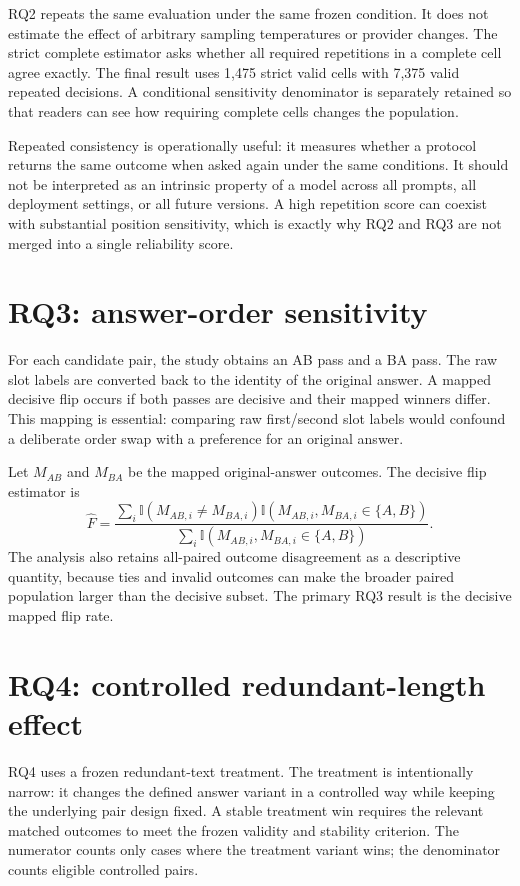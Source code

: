 RQ2 repeats the same evaluation under the same frozen condition. It does not estimate the effect of arbitrary sampling temperatures or provider changes. The strict complete estimator asks whether all required repetitions in a complete cell agree exactly. The final result uses 1,475 strict valid cells with 7,375 valid repeated decisions. A conditional sensitivity denominator is separately retained so that readers can see how requiring complete cells changes the population.

Repeated consistency is operationally useful: it measures whether a protocol returns the same outcome when asked again under the same conditions. It should not be interpreted as an intrinsic property of a model across all prompts, all deployment settings, or all future versions. A high repetition score can coexist with substantial position sensitivity, which is exactly why RQ2 and RQ3 are not merged into a single reliability score.

\section{RQ3: answer-order sensitivity}

For each candidate pair, the study obtains an AB pass and a BA pass. The raw slot labels are converted back to the identity of the original answer. A mapped decisive flip occurs if both passes are decisive and their mapped winners differ. This mapping is essential: comparing raw first/second slot labels would confound a deliberate order swap with a preference for an original answer.

Let $M_{AB}$ and $M_{BA}$ be the mapped original-answer outcomes. The decisive flip estimator is
\[
\hat{F}=\frac{\sum_i \mathbb{I}(M_{AB,i}\neq M_{BA,i})\mathbb{I}(M_{AB,i},M_{BA,i}\in\{A,B\})}{\sum_i \mathbb{I}(M_{AB,i},M_{BA,i}\in\{A,B\})}.
\]
The analysis also retains all-paired outcome disagreement as a descriptive quantity, because ties and invalid outcomes can make the broader paired population larger than the decisive subset. The primary RQ3 result is the decisive mapped flip rate.

\section{RQ4: controlled redundant-length effect}

RQ4 uses a frozen redundant-text treatment. The treatment is intentionally narrow: it changes the defined answer variant in a controlled way while keeping the underlying pair design fixed. A stable treatment win requires the relevant matched outcomes to meet the frozen validity and stability criterion. The numerator counts only cases where the treatment variant wins; the denominator counts eligible controlled pairs.

